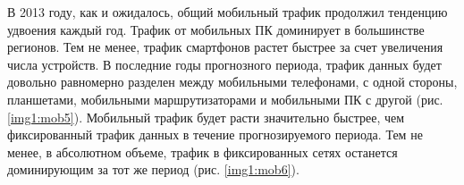 В 2013 году, как и ожидалось, общий мобильный трафик продолжил тенденцию удвоения каждый год. Трафик от мобильных ПК доминирует в большинстве регионов. Тем не менее, трафик смартфонов растет быстрее за счет увеличения числа устройств. В последние годы прогнозного периода, трафик данных будет довольно равномерно разделен между мобильными телефонами, с одной стороны, планшетами, мобильными маршрутизаторами и мобильными ПК с другой (рис. \ref{img1:mob5}). Мобильный трафик будет расти значительно быстрее, чем фиксированный трафик данных в течение прогнозируемого периода. Тем не менее, в абсолютном объеме, трафик в фиксированных сетях останется доминирующим за тот же период (рис. \ref{img1:mob6}). 

\clearpage




\usetikzlibrary{patterns}

